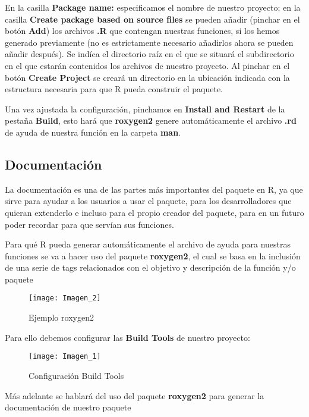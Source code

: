 En la casilla \textbf{Package name:} especificamos el nombre de nuestro proyecto; en la casilla
\textbf{Create package based on source files} se pueden a\~nadir (pinchar en el bot\'on \textbf{Add}) los
archivos \textbf{.R} que contengan nuestras funciones, si los hemos generado previamente (no es
estrictamente necesario a\~nadirlos ahora se pueden a\~nadir despu\'es).
Se ind\'ica el directorio ra\'iz en el que se situar\'a el subdirectorio en el que estar\'an
contenidos los archivos de nuestro proyecto. 
Al pinchar en el bot\'on \textbf{Create Project} se crear\'a un directorio en la ubicaci\'on indicada con la
estructura necesaria para que R pueda construir el paquete.

Una vez ajustada la configuraci\'on, pinchamos en \textbf{Install and Restart} de la pesta\~na \textbf{Build}, esto har\'a que \textbf{roxygen2} genere autom\'aticamente el archivo \textbf{.rd} de ayuda de nuestra funci\'on en la carpeta \textbf{man}.

\subsection{Documentaci\'on}

La documentaci\'on es una de las partes m\'as importantes del paquete en R, ya que sirve para
ayudar a los usuarios a usar el paquete, para los desarrolladores que quieran extenderlo e
incluso para el propio creador del paquete, para en un futuro poder recordar para que serv\'ian
sus funciones.

Para qu\'e R pueda generar autom\'aticamente el archivo de ayuda para nuestras funciones
se va a hacer uso del paquete \textbf{roxygen2}, el cual se basa en la inclusi\'on de una serie de tags relacionados con el objetivo y descripci\'on de la funci\'on y/o paquete 


\begin{figure}[H]
    \centering
    \texttt{[image: Imagen\_2]}
    \caption{Ejemplo roxygen2   }
    \label{fig:roxygen}
\end{figure} 

Para ello debemos configurar las \textbf{Build Tools} de nuestro proyecto:

\begin{figure}[H]
    \centering
    \texttt{[image: Imagen\_1]}
    \caption{Configuraci\'on Build Tools }
    \label{fig:build_tools}
\end{figure} 

M\'as adelante se hablar\'a del uso del paquete \textbf{roxygen2} para generar la documentaci\'on de nuestro paquete

